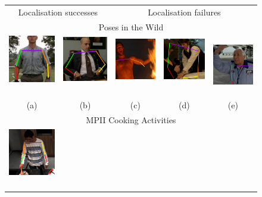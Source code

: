 \documentclass[runningheads]{llncs}
\begin{document}
\begin{figure}[t]
\begin{center}
\begin{tabular}{@{}c@{}c c@{}c@{}c@{}}
\multicolumn{2}{c}{Localisation successes} &
\multicolumn{3}{c}{Localisation failures}\\[0.4em]
\multicolumn{5}{c}{Poses in the Wild}\\
\includegraphics[width=0.19\linewidth]{figures/shots-cropped/piw-s18f30-good-gump-mower.jpg}\,&
\includegraphics[width=0.19\linewidth]{figures/shots-cropped/piw-s20f2-good-suit.jpg}\,&
\includegraphics[width=0.19\linewidth]{figures/shots-cropped/piw-s9f18-bad-no-wrist.jpg}\,&
\includegraphics[width=0.19\linewidth]{figures/shots-cropped/piw-s10f27-bad-pose-transfer.jpg}\,&
\includegraphics[width=0.19\linewidth]{figures/shots-cropped/piw-s13f15-bad-terminal-movement.jpg}\\
(a) & (b) & (c) & (d) & (e)\\[0.6em]
\multicolumn{5}{c}{MPII Cooking Activities}\\
\includegraphics[width=0.19\linewidth]{figures/shots-cropped/mpii-s10f54-good-white-shirt.jpg}\,&

\end{tabular}
\end{center}
\end{figure}
\end{document}
